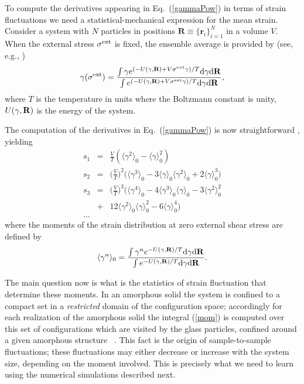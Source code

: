 \documentclass[pre,twocolumn,aps,10pt,superscriptaddress,notitlepage,nofootinbib]{revtex4-1}
\newcommand{\B}[1]{{\bm{#1}}}
\newcommand{\ud}{\mathrm{d}}
\begin{document}
To compute the derivatives appearing in Eq.~(\ref{gammaPow}) in terms of strain fluctuations we need
a statistical-mechanical expression for the mean strain. Consider a system with $N$ particles in positions $\B R\equiv \{\B r_i\}_{i=1}^N$ in a volume $V$. When the external stress $\sigma^{\rm ext}$ is fixed, the ensemble average is provided by (see, e.g., \cite{DIMP14})
\begin{equation}
\gamma(\sigma^{\rm ext})=\frac{\int\gamma  e^{(-U(\gamma,{\bf R}) +V\sigma^{ext}\gamma)/T}\ud \gamma\ud {\bf R}}{\int e^{(-U(\gamma,{\bf R}) +V\sigma^{\rm ext}\gamma)/T}\ud \gamma\ud {\bf R}},
\label{Msear}
\end{equation}
where $T$ is the temperature in units where the Boltzmann constant is unity, $U(\gamma,{\bf R})$ is the energy of the system.

The computation of the derivatives in Eq.~(\ref{gammaPow}) is now straightforward \cite{RT10}, yielding
\begin{eqnarray}
s_1&=&\frac{V}{T}(\langle\gamma^2\rangle_0-\langle\gamma\rangle_0^2)\nonumber\\
s_2&=&\bigg(\frac{V}{T}\bigg)^2\big(\langle \gamma^3\rangle_0-3\langle\gamma\rangle_0\langle\gamma^2\rangle_0+2\langle\gamma\rangle_0^3\big)\nonumber\\
s_3&=&\bigg(\frac{V}{T}\bigg)^3\big(\langle \gamma^4\rangle_0-4\langle\gamma^3\rangle_0\langle\gamma\rangle_0-3\langle\gamma^2\rangle_0^2\nonumber\\
&+&12\langle\gamma^2\rangle_0\langle\gamma\rangle_0^2-6\langle\gamma\rangle_0^4\big)\nonumber\\
\ldots
\label{Ccum}
\end{eqnarray}
where the moments of the strain distribution at zero external shear stress are defined by
\begin{equation}
\langle\gamma^n\rangle_0=\frac{\int\gamma^n e^{-U(\gamma,{\bf R})/T} \ud \gamma\ud {\bf R}}{\int e^{-U(\gamma,{\bf R})/T}\ud \gamma\ud {\bf R}}.
\label{mom}
\end{equation}

The main question now is what is the statistics of strain fluctuation that determine these moments. In an amorphous solid the system is confined to a compact set in a \emph{restricted} domain of the configuration space; accordingly for each realization of the amorphous solid the integral (\ref{mom}) is computed over this set of configurations which are visited by the glass particles, confined around a given amorphous structure ~\cite{corrado2,DubeyProcaccia16}. This fact is the origin of sample-to-sample fluctuations;  these fluctuations may either decrease or increase with the system size, depending on the moment involved. This is precisely what
we need to learn using the numerical simulations described next.
\end{document}
